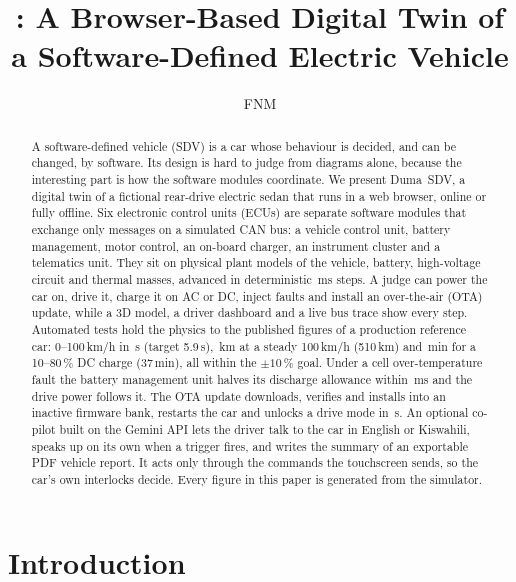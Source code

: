 \documentclass[10pt]{article}
\title{\sdv: A Browser-Based Digital Twin of a Software-Defined Electric Vehicle}
\author{FNM}
\affiliation{Software-Defined Electric Vehicle Design Challenge}
\newcommand{\sdv}{Duma~SDV}
\begin{document}
\maketitle

\begin{abstract}
A software-defined vehicle (SDV) is a car whose behaviour is decided, and can be changed, by software. Its design is hard to judge from diagrams alone, because the interesting part is how the software modules coordinate. We present \sdv{}, a digital twin of a fictional rear-drive electric sedan that runs in a web browser, online or fully offline. Six electronic control units (ECUs) are separate software modules that exchange only messages on a simulated CAN bus: a vehicle control unit, battery management, motor control, an on-board charger, an instrument cluster and a telematics unit. They sit on physical plant models of the vehicle, battery, high-voltage circuit and thermal masses, advanced in deterministic \ParTickMs\,ms steps. A judge can power the car on, drive it, charge it on AC or DC, inject faults and install an over-the-air (OTA) update, while a 3D model, a driver dashboard and a live bus trace show every step. Automated tests hold the physics to the published figures of a production reference car: 0--100\,km/h in \ResZeroHundred\,s (target 5.9\,s), \ResRange\,km at a steady 100\,km/h (510\,km) and \ResDcMin\,min for a 10--80\,\% DC charge (37\,min), all within the $\pm 10\,\%$ goal. Under a cell over-temperature fault the battery management unit halves its discharge allowance within \FaultLimitMs\,ms and the drive power follows it. The OTA update downloads, verifies and installs into an inactive firmware bank, restarts the car and unlocks a drive mode in \OtaReadyS\,s. An optional co-pilot built on the Gemini API lets the driver talk to the car in English or Kiswahili, speaks up on its own when a trigger fires, and writes the summary of an exportable PDF vehicle report. It acts only through the commands the touchscreen sends, so the car's own interlocks decide. Every figure in this paper is generated from the simulator.
\end{abstract}

\section{Introduction}
\end{document}
